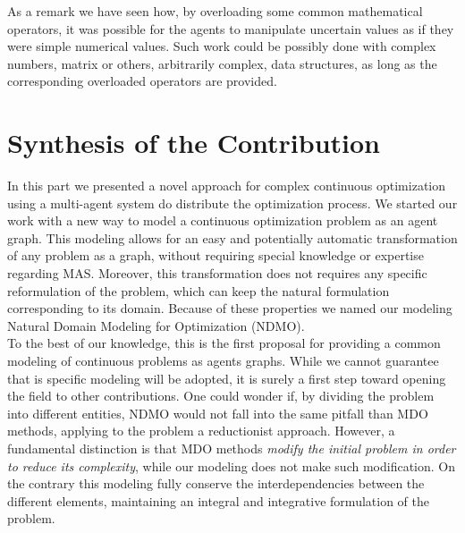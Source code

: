 As a remark we have seen how, by overloading some common mathematical operators, it was possible for the agents to manipulate uncertain values as if they were simple numerical values. Such work could be possibly done with complex numbers, matrix or others, arbitrarily complex, data structures, as long as the corresponding overloaded operators are provided.

\chapter*{Synthesis of the Contribution}

In this part we presented a novel approach for complex continuous optimization using a multi-agent system do distribute the optimization process. We started our work with a new way to model a continuous optimization problem as an agent graph. This modeling allows for an easy and potentially automatic transformation of any problem as a graph, without requiring special knowledge or expertise regarding MAS. Moreover, this transformation does not requires any specific reformulation of the problem,  which can keep the natural formulation corresponding to its domain. Because of these properties we named our modeling Natural Domain Modeling for Optimization (NDMO).
\\
To the best of our knowledge, this is the first proposal for providing a common modeling of continuous problems as agents graphs. While we cannot guarantee that is specific modeling will be adopted, it is surely a first step toward opening the field to other contributions.  One could wonder if, by dividing the problem into different entities, NDMO would not fall into the same pitfall than MDO methods, applying to the problem a reductionist approach. However, a fundamental distinction is that MDO methods \emph{modify the initial problem in order to reduce its complexity}, while our modeling does not make such modification. On the contrary this modeling fully conserve the interdependencies between the different elements, maintaining an integral and integrative formulation of the problem.

